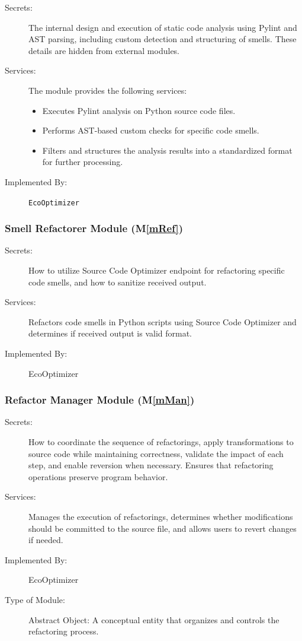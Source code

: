 \documentclass[12pt, titlepage]{article}
\newcommand{\mref}[1]{M\ref{#1}}
\begin{document}
\begin{description}
\item[Secrets:] The internal design and execution of static code analysis using Pylint and AST parsing, including custom detection and structuring of smells. These details are hidden from external modules.
\item[Services:] The module provides the following services:
  \begin{itemize}
    \item Executes Pylint analysis on Python source code files.
    \item Performs AST-based custom checks for specific code smells.
    \item Filters and structures the analysis results into a standardized format for further processing.
  \end{itemize}
\item[Implemented By:] \texttt{EcoOptimizer}
\end{description}


\subsubsection{Smell Refactorer Module (\mref{mRef})}


\begin{description}
    \item[Secrets:] How to utilize Source Code Optimizer endpoint for refactoring specific code smells, and how to sanitize received output.
    \item[Services:] Refactors code smells in Python scripts using Source Code Optimizer and determines if received output is valid format.
    \item[Implemented By:] EcoOptimizer
\end{description}


\subsubsection{Refactor Manager Module (\mref{mMan})}

\begin{description}
    \item[Secrets:] How to coordinate the sequence of refactorings, apply transformations to source code while maintaining correctness, validate the impact of each step, and enable reversion when necessary. Ensures that refactoring operations preserve program behavior.

    \item[Services:] Manages the execution of refactorings, determines whether modifications should be committed to the source file, and allows users to revert changes if needed.

    \item[Implemented By:] EcoOptimizer
    \item[Type of Module:] Abstract Object: A conceptual entity that organizes and controls the refactoring process.
\end{description}
\end{document}
